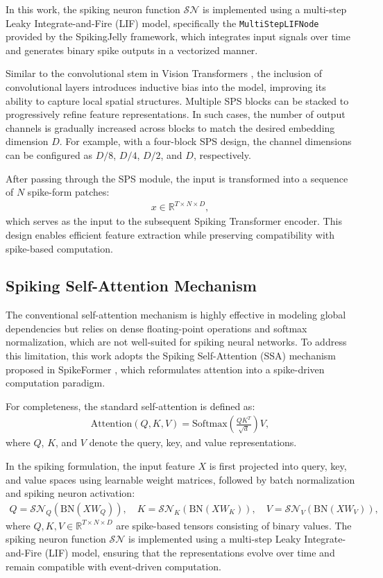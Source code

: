 \documentclass[../main.tex]{subfiles}
\begin{document}
In this work, the spiking neuron function $\mathcal{SN}$ is implemented using a multi-step Leaky Integrate-and-Fire (LIF) model, specifically the \texttt{MultiStepLIFNode} provided by the SpikingJelly \cite{SpikingJelly} framework, which integrates input signals over time and generates binary spike outputs in a vectorized manner.

Similar to the convolutional stem in Vision Transformers \cite{xiao2021early,hassani2021escaping}, the inclusion of convolutional layers introduces inductive bias into the model, improving its ability to capture local spatial structures. Multiple SPS blocks can be stacked to progressively refine feature representations. In such cases, the number of output channels is gradually increased across blocks to match the desired embedding dimension $D$. For example, with a four-block SPS design, the channel dimensions can be configured as $D/8$, $D/4$, $D/2$, and $D$, respectively.

After passing through the SPS module, the input is transformed into a sequence of $N$ spike-form patches:
\begin{align}
x \in \mathbb{R}^{T \times N \times D},
\end{align}
which serves as the input to the subsequent Spiking Transformer encoder. This design enables efficient feature extraction while preserving compatibility with spike-based computation.

\subsection{Spiking Self-Attention Mechanism}

The conventional self-attention mechanism is highly effective in modeling global dependencies but relies on dense floating-point operations and softmax normalization, which are not well-suited for spiking neural networks. To address this limitation, this work adopts the Spiking Self-Attention (SSA) mechanism proposed in SpikeFormer \cite{zhou2023spikeformer}, which reformulates attention into a spike-driven computation paradigm.

For completeness, the standard self-attention is defined as:
\begin{align}
\mathrm{Attention}(Q,K,V)=\mathrm{Softmax}\left(\frac{QK^T}{\sqrt{d}}\right)V,
\end{align}
where $Q$, $K$, and $V$ denote the query, key, and value representations.

In the spiking formulation, the input feature $X$ is first projected into query, key, and value spaces using learnable weight matrices, followed by batch normalization and spiking neuron activation:
\begin{align}
Q = \mathcal{SN}_Q(\mathrm{BN}(XW_Q)), \quad 
K = \mathcal{SN}_K(\mathrm{BN}(XW_K)), \quad 
V = \mathcal{SN}_V(\mathrm{BN}(XW_V)),
\end{align}
where $Q, K, V \in \mathbb{R}^{T \times N \times D}$ are spike-based tensors consisting of binary values. The spiking neuron function $\mathcal{SN}$ is implemented using a multi-step Leaky Integrate-and-Fire (LIF) model, ensuring that the representations evolve over time and remain compatible with event-driven computation.
\end{document}
